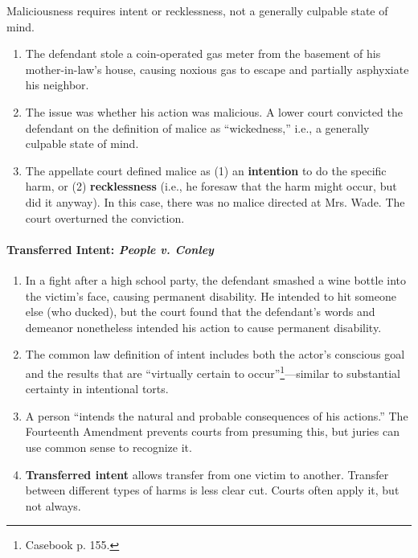 Maliciousness requires intent or recklessness, not a generally culpable state 
of mind.

\begin{enumerate}
    \item The defendant stole a coin-operated gas meter from the basement of 
    his mother-in-law's house, causing noxious gas to escape and partially 
    asphyxiate his neighbor.
    \item The issue was whether his action was malicious. A lower court 
    convicted the defendant on the definition of malice as ``wickedness,'' 
    i.e., a generally culpable state of mind.
    \item The appellate court defined malice as (1) an \textbf{intention} to 
    do the specific harm, or (2) \textbf{recklessness} (i.e., he foresaw that 
    the harm might occur, but did it anyway). In this case, there was no 
    malice directed at Mrs. Wade. The court overturned the conviction.
\end{enumerate}

\paragraph{Transferred Intent: \emph{People v. Conley}}

\begin{enumerate}
    \item In a fight after a high school party, the defendant smashed a wine 
    bottle into the victim's face, causing permanent disability. He intended 
    to hit someone else (who ducked), but the court found that the defendant's 
    words and demeanor nonetheless intended his action to cause permanent 
    disability.
    \item The common law definition of intent includes both the actor's 
    conscious goal and the results that are ``virtually certain to 
    occur''\footnote{Casebook p. 155.}---similar to substantial certainty in 
    intentional torts.
    \item A person ``intends the natural and probable consequences of his 
    actions.'' The Fourteenth Amendment prevents courts from presuming this, 
    but juries can use common sense to recognize it.
    \item \textbf{Transferred intent}  allows transfer from one victim to 
    another. Transfer between different types of harms is less clear cut.  
    Courts often apply it, but not always.
\end{enumerate}

